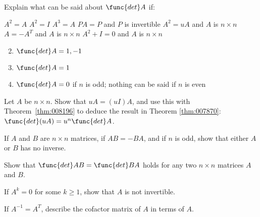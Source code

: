 \begin{multicols}{2}
\begin{ex}
\begin{sol}
\begin{enumerate}[label={\alph*.}]
\end{enumerate}
\end{sol}
\end{ex}

\begin{ex}
Explain what can be said about $\func{det }A$ if:

\begin{exenumerate}
\exitem $A^{2} = A$
\exitem $A^{2} = I$
\exitem $A^{3} = A$
\exitem $PA = P$ and $P$ is invertible
\exitem $A^{2} = uA$ and $A$ is $n \times n$
\exitem $A = -A^{T}$ and $A$ is $n \times n$
\exitem $A^{2} + I = 0$ and $A$ is $n \times n$
\end{exenumerate}
\begin{sol}
\begin{enumerate}[label={\alph*.}]
\setcounter{enumi}{1}
\item  $\func{det } A = 1, -1$

\setcounter{enumi}{3}
\item $\func{det }A = 1$

\setcounter{enumi}{5}
\item  $\func{det }A = 0$ if $n$ is odd; nothing can be said if $n$ is even

\end{enumerate}
\end{sol}
\end{ex}

\begin{ex}
Let $A$ be $n \times n$. Show that $uA = (uI)A$, and use this with Theorem~\ref{thm:008196} to deduce the result in Theorem \ref{thm:007870}: $\func{det}(uA) = u^{n} \func{det }A$.
\end{ex}

\begin{ex}
If $A$ and $B$ are $n \times n$ matrices, if $AB = -BA$, and if $n$ is odd, show that either $A$ or $B$ has no inverse.
\end{ex}

\begin{ex}
Show that $\func{det }AB = \func{det }BA$ holds for any two $n \times n$ matrices $A$ and $B$.
\end{ex}

\begin{ex}
If $A^{k} = 0$ for some $k \geq 1$, show that $A$ is not invertible.
\end{ex}

\begin{ex}
If $A^{-1} = A^{T}$, describe the cofactor matrix of $A$ in terms of $A$.


\end{ex}
\end{multicols}
